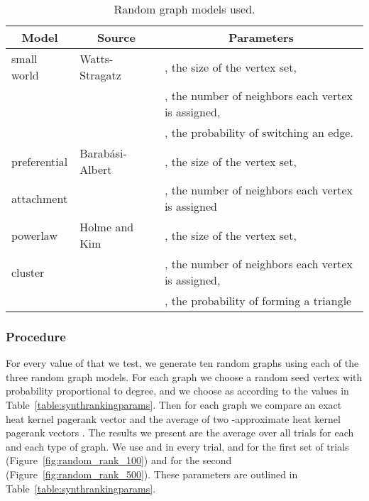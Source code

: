 \documentclass[runningheads,a4paper]{llncs}
\begin{document}
\begin{table}
\begin{tabular}{|l|l|l|}
\hline
\multicolumn{1}{|c|}{Model} & \multicolumn{1}{|c|}{Source} & \multicolumn{1}{|c|}{Parameters}\\
\hline\hline
small world & Watts-Stragatz\cite{wattsstrogatz} & , the size of the vertex set,\\
            &                & , the number of neighbors each vertex is
assigned,\\
            &                & , the probability of switching an edge.\\
\hline
preferential& Barab\'{a}si-Albert\cite{barabasialbert} & , the size of the
vertex set,\\
attachment  &                                          & , the number of
neighbors each vertex is assigned\\
\hline
powerlaw    & Holme and Kim~\cite{holmekim} & , the size of the vertex set,\\
cluster     &                               & , the number of neighbors each
vertex is assigned,\\
            &                               & , the probability of forming a
triangle\\
\hline
\end{tabular}
\caption{Random graph models used.}
\label{table:randomgraphs}
\end{table}

\subsubsection{Procedure} For every value of  that we test, we generate ten
random graphs using each of the three random graph models.  For each graph we
choose a random seed vertex  with probability proportional to degree, and we
choose  as  according to the values in
Table~\ref{table:synthrankingparams}.  Then for each graph we compare an exact
heat kernel pagerank vector  and the average of two
-approximate heat kernel pagerank vectors .  The results
we present are the average over all trials for each  and each type of graph.
We use  and  in every trial, and  for the first set of trials
(Figure~\ref{fig:random_rank_100}) and  for the second
(Figure~\ref{fig:random_rank_500}).  These parameters are outlined in
Table~\ref{table:synthrankingparams}.
\end{document}
